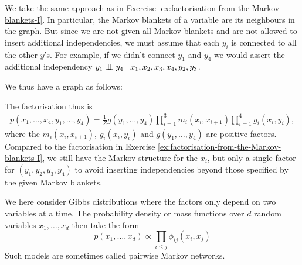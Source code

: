 \begin{solution}
We take the same approach as in Exercise
\ref{ex:factorisation-from-the-Markov-blankets-I}. In particular, the
Markov blankets of a variable are its neighbours in the graph. But
since we are not given all Markov blankets and are not allowed to
insert additional independencies, we must assume that each $y_i$ is
connected to all the other $y$'s. For example, if we didn't connect
$y_1$ and $y_4$ we would assert the additional independency $y_1
\mathrel{\perp\mspace{-10mu}\perp} y_4 \mid x_1,x_2,x_3,x_4,y_2,y_3$.

We thus have a graph as follows:

\begin{center}
\end{center}

The factorisation thus is
\begin{align}
  p(x_1, \ldots, x_4, y_1, \ldots, y_4) = \frac{1}{Z} g(y_1, \ldots, y_4) \prod_{i=1}^3 m_i(x_i,x_{i+1})\prod_{i=1}^4 g_i(x_i,y_i),
\end{align}
where the $m_i(x_i, x_{i+1})$, $g_i(x_i, y_i)$ and $g(y_1, \ldots, y_4)$ are positive
factors. Compared to the factorisation in Exercise
\ref{ex:factorisation-from-the-Markov-blankets-I}, we still have the
Markov structure for the $x_i$, but only a single factor for $(y_1,
y_2, y_3, y_4)$ to avoid inserting independencies beyond those
specified by the given Markov blankets.


\end{solution}



We here consider Gibbs distributions where the factors only depend on two variables at
a time. The probability density or mass functions over $d$ random
variables $x_1, \ldots, x_d$ then take the form
$$p(x_1, \ldots, x_d) \propto \prod_{i \le j} \phi_{ij}(x_i,x_j)$$
Such models are sometimes called pairwise Markov networks.

